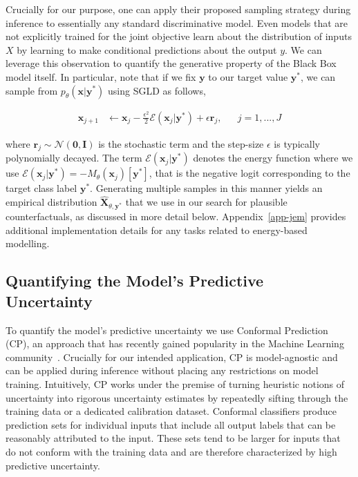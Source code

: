 \documentclass{article}
\begin{document}
Crucially for our purpose, one can apply their proposed sampling strategy during inference to essentially any standard discriminative model. Even models that are not explicitly trained for the joint objective learn about the distribution of inputs $X$ by learning to make conditional predictions about the output $y$. We can leverage this observation to quantify the generative property of the Black Box model itself. In particular, note that if we fix $\mathbf{y}$ to our target value $\mathbf{y}^*$, we can sample from $p_{\theta}(\mathbf{x}|\mathbf{y}^*)$ using SGLD as follows, 

\begin{equation}\label{eq:sgld}
  \begin{aligned}
    \mathbf{x}_{j+1} &\leftarrow \mathbf{x}_j - \frac{\epsilon^2}{2} \mathcal{E}(\mathbf{x}_j|\mathbf{y}^*) + \epsilon \mathbf{r}_j, && j=1,...,J
  \end{aligned}
\end{equation}

where $\mathbf{r}_j \sim \mathcal{N}(\mathbf{0},\mathbf{I})$ is the stochastic term and the step-size $\epsilon$ is typically polynomially decayed. The term $\mathcal{E}(\mathbf{x}_j|\mathbf{y}^*)$ denotes the energy function where we use $\mathcal{E}(\mathbf{x}_j|\mathbf{y}^*)=-M_{\theta}(\mathbf{x}_j)[\mathbf{y}^*]$, that is the negative logit corresponding to the target class label $\mathbf{y}^*$. Generating multiple samples in this manner yields an empirical distribution $\hat{\mathbf{X}}_{\theta,\mathbf{y}^*}$ that we use in our search for plausible counterfactuals, as discussed in more detail below. Appendix~\ref{app-jem} provides additional implementation details for any tasks related to energy-based modelling. 

\subsection{Quantifying the Model's Predictive Uncertainty}

To quantify the model's predictive uncertainty we use Conformal Prediction (CP), an approach that has recently gained popularity in the Machine Learning community~\citep{angelopoulos2021gentle,manokhin2022awesome}. Crucially for our intended application, CP is model-agnostic and can be applied during inference without placing any restrictions on model training. Intuitively, CP works under the premise of turning heuristic notions of uncertainty into rigorous uncertainty estimates by repeatedly sifting through the training data or a dedicated calibration dataset. Conformal classifiers produce prediction sets for individual inputs that include all output labels that can be reasonably attributed to the input. These sets tend to be larger for inputs that do not conform with the training data and are therefore characterized by high predictive uncertainty. 
\end{document}
